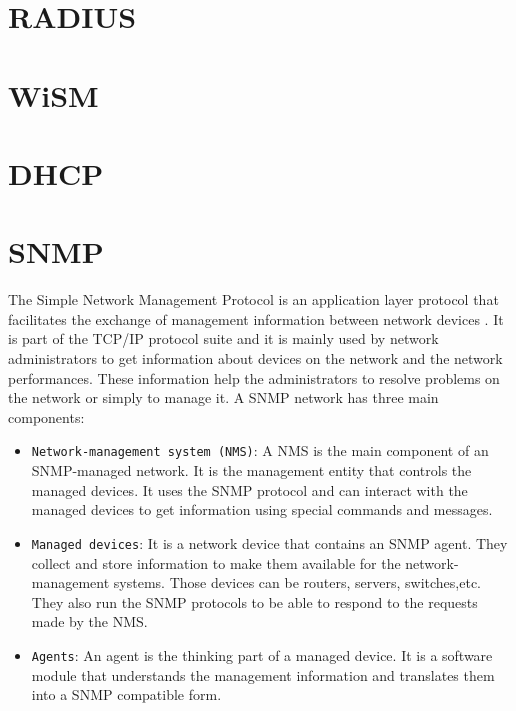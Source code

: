\section{RADIUS}


\section{WiSM}



\section{DHCP}



\section{SNMP}

The Simple Network Management Protocol is an application layer protocol that facilitates the exchange of management information between network devices \cite{snmp}. It is part of the TCP/IP protocol suite and it is mainly used by network administrators to get information about devices on the network and the network performances. These information help the administrators to resolve problems on the network or simply to manage it.
A SNMP network has three main components:

\begin{itemize}
	\item \texttt{Network-management system (NMS)}: A NMS is the main component of an SNMP-managed network. It is the management entity that controls the managed devices. It uses the SNMP protocol and can interact with the managed devices to get information using special commands and messages.
	
	\item \texttt{Managed devices}: It is a network device that contains an SNMP agent. They collect and store information to make them available for the network-management systems. Those devices can be routers, servers, switches,etc. They also run the SNMP protocols to be able to respond to the requests made by the NMS.
	
	\item \texttt{Agents}: An agent is the thinking part of a managed device. It is a software module that understands the management information and translates them into a SNMP compatible form.
\end{itemize}

